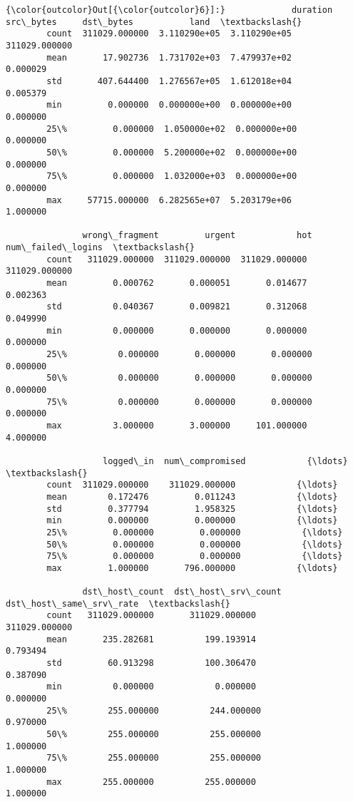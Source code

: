 \documentclass[11pt]{article}
\begin{document}
\begin{Verbatim}[commandchars=\\\{\}]
{\color{outcolor}Out[{\color{outcolor}6}]:}             duration     src\_bytes     dst\_bytes           land  \textbackslash{}
        count  311029.000000  3.110290e+05  3.110290e+05  311029.000000   
        mean       17.902736  1.731702e+03  7.479937e+02       0.000029   
        std       407.644400  1.276567e+05  1.612018e+04       0.005379   
        min         0.000000  0.000000e+00  0.000000e+00       0.000000   
        25\%         0.000000  1.050000e+02  0.000000e+00       0.000000   
        50\%         0.000000  5.200000e+02  0.000000e+00       0.000000   
        75\%         0.000000  1.032000e+03  0.000000e+00       0.000000   
        max     57715.000000  6.282565e+07  5.203179e+06       1.000000   
        
               wrong\_fragment         urgent            hot  num\_failed\_logins  \textbackslash{}
        count   311029.000000  311029.000000  311029.000000      311029.000000   
        mean         0.000762       0.000051       0.014677           0.002363   
        std          0.040367       0.009821       0.312068           0.049990   
        min          0.000000       0.000000       0.000000           0.000000   
        25\%          0.000000       0.000000       0.000000           0.000000   
        50\%          0.000000       0.000000       0.000000           0.000000   
        75\%          0.000000       0.000000       0.000000           0.000000   
        max          3.000000       3.000000     101.000000           4.000000   
        
                   logged\_in  num\_compromised            {\ldots}             \textbackslash{}
        count  311029.000000    311029.000000            {\ldots}              
        mean        0.172476         0.011243            {\ldots}              
        std         0.377794         1.958325            {\ldots}              
        min         0.000000         0.000000            {\ldots}              
        25\%         0.000000         0.000000            {\ldots}              
        50\%         0.000000         0.000000            {\ldots}              
        75\%         0.000000         0.000000            {\ldots}              
        max         1.000000       796.000000            {\ldots}              
        
               dst\_host\_count  dst\_host\_srv\_count  dst\_host\_same\_srv\_rate  \textbackslash{}
        count   311029.000000       311029.000000           311029.000000   
        mean       235.282681          199.193914                0.793494   
        std         60.913298          100.306470                0.387090   
        min          0.000000            0.000000                0.000000   
        25\%        255.000000          244.000000                0.970000   
        50\%        255.000000          255.000000                1.000000   
        75\%        255.000000          255.000000                1.000000   
        max        255.000000          255.000000                1.000000   
        

\end{Verbatim}
\end{document}
